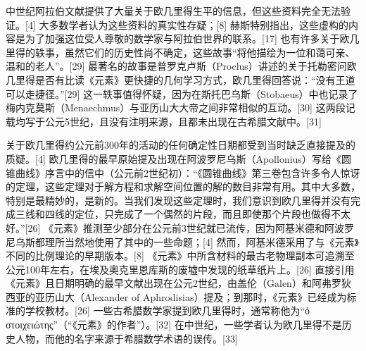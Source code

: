 中世纪阿拉伯文献提供了大量关于欧几里得生平的信息，但这些资料完全无法验证。[4] 大多数学者认为这些资料的真实性存疑；[8] 赫斯特别指出，这些虚构的内容是为了加强这位受人尊敬的数学家与阿拉伯世界的联系。[17] 也有许多关于欧几里得的轶事，虽然它们的历史性尚不确定，这些故事“将他描绘为一位和蔼可亲、温和的老人”。[29] 最著名的故事是普罗克卢斯（Proclus）讲述的关于托勒密问欧几里得是否有比读《元素》更快捷的几何学习方式，欧几里得回答说：“没有王道可以走捷径。”[29] 这一轶事值得怀疑，因为在斯托巴乌斯（Stobaeus）中也记录了梅内克莫斯（Menaechmus）与亚历山大大帝之间非常相似的互动。[30] 这两段记载均写于公元5世纪，且没有注明来源，且都未出现在古希腊文献中。[31]

关于欧几里得约公元前300年的活动的任何确定性日期都受到当时缺乏直接提及的质疑。[4] 欧几里得的最早原始提及出现在阿波罗尼乌斯（Apollonius）写给《圆锥曲线》序言中的信中（公元前2世纪初）：“《圆锥曲线》第三卷包含许多令人惊讶的定理，这些定理对于解方程和求解空间位置的解的数目非常有用。其中大多数，特别是最精妙的，是新的。当我们发现这些定理时，我们意识到欧几里得并没有完成三线和四线的定位，只完成了一个偶然的片段，而且即使那个片段也做得不太好。”[26] 《元素》推测至少部分在公元前3世纪就已流传，因为阿基米德和阿波罗尼乌斯都理所当然地使用了其中的一些命题；[4] 然而，阿基米德采用了与《元素》不同的比例理论的早期版本。[8] 《元素》中所含材料的最古老物理副本可追溯至公元100年左右，在埃及奥克里恩库斯的废墟中发现的纸草纸片上。[26] 直接引用《元素》且日期明确的最早文献出现在公元2世纪，由盖伦（Galen）和阿弗罗狄西亚的亚历山大（Alexander of Aphrodisias）提及；到那时，《元素》已经成为标准的学校教材。[26] 一些古希腊数学家提到欧几里得时，通常称他为“ὁ στοιχειώτης”（“《元素》的作者”）。[32] 在中世纪，一些学者认为欧几里得不是历史人物，而他的名字来源于希腊数学术语的误传。[33]